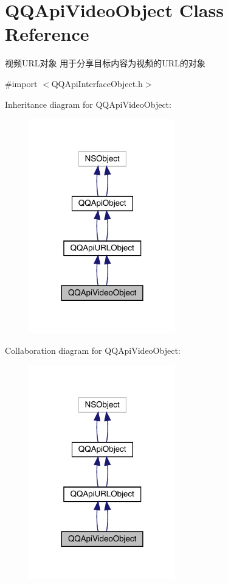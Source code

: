\hypertarget{interface_q_q_api_video_object}{}\section{Q\+Q\+Api\+Video\+Object Class Reference}
\label{interface_q_q_api_video_object}


视频\+U\+R\+L对象 用于分享目标内容为视频的\+U\+R\+L的对象  




{\ttfamily \#import $<$Q\+Q\+Api\+Interface\+Object.\+h$>$}



Inheritance diagram for Q\+Q\+Api\+Video\+Object\+:\nopagebreak
\begin{figure}[H]
\begin{center}
\leavevmode
\includegraphics[width=180pt]{interface_q_q_api_video_object__inherit__graph}
\end{center}
\end{figure}


Collaboration diagram for Q\+Q\+Api\+Video\+Object\+:\nopagebreak
\begin{figure}[H]
\begin{center}
\leavevmode
\includegraphics[width=180pt]{interface_q_q_api_video_object__coll__graph}
\end{center}
\end{figure}
